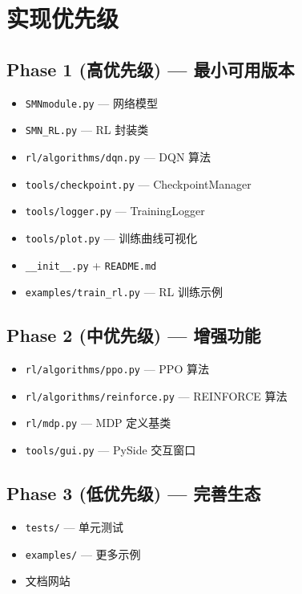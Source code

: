 \documentclass[11pt]{ctexart}
\begin{document}
\section{实现优先级}

\subsection{Phase 1 (高优先级) --- 最小可用版本}

\begin{itemize}[leftmargin=2em]
  \item \texttt{SMNmodule.py} --- 网络模型
  \item \texttt{SMN\_RL.py} --- RL 封装类
  \item \texttt{rl/algorithms/dqn.py} --- DQN 算法
  \item \texttt{tools/checkpoint.py} --- CheckpointManager
  \item \texttt{tools/logger.py} --- TrainingLogger
  \item \texttt{tools/plot.py} --- 训练曲线可视化
  \item \texttt{\_\_init\_\_.py} + \texttt{README.md}
  \item \texttt{examples/train\_rl.py} --- RL 训练示例
\end{itemize}

\subsection{Phase 2 (中优先级) --- 增强功能}

\begin{itemize}[leftmargin=2em]
  \item \texttt{rl/algorithms/ppo.py} --- PPO 算法
  \item \texttt{rl/algorithms/reinforce.py} --- REINFORCE 算法
  \item \texttt{rl/mdp.py} --- MDP 定义基类
  \item \texttt{tools/gui.py} --- PySide 交互窗口
\end{itemize}

\subsection{Phase 3 (低优先级) --- 完善生态}

\begin{itemize}[leftmargin=2em]
  \item \texttt{tests/} --- 单元测试
  \item \texttt{examples/} --- 更多示例
  \item 文档网站
\end{itemize}
\end{document}
